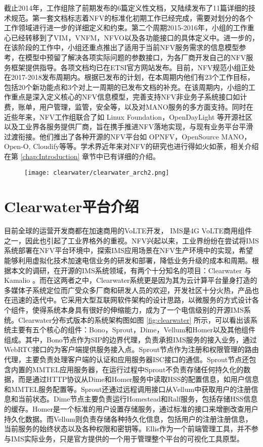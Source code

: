 截止2014年，工作组除了前期发布的6篇定义性文档，又陆续发布了11篇详细的技术规范。第一套文档标志着NFV的标准化初期工作已经完成，需要对划分的各个工作领域进行进一步的详细定义和约束。第二个周期2015-2016年，小组的工作重心已经转移到了VIM，VNFM，NFVO以及各功能接口的具体定义中。进一步的，在该阶段的工作中，小组还重点推出了适用于当前NFV服务需求的信息模型参考，在模型中预留了解决各项实际问题的参数接口，为各厂商开发自己的NFV服务框架提供指导。各项文档均已在ETSI官方网站发布。目前，NFV规范小组正处在2017-2018发布周期内。根据已发布的计划，在本周期内他们有23个工作目标，包括20个新功能点和3个对上一周期的已发布文档的补充。在该周期内，小组的工作重点是深入定义核心的NFV信息模型，完善支持NFV非业务子系统接口如计费，账单，用户管理，监管，安全等，以及对MANO服务的多方面支持。同时在近些年来，NFV工作组联合了如 Linux Foundation，OpenDayLight 等开源社区以及工业界各服务提供厂商，旨在携手推进NFV落地实现，与现有业务平台平滑过渡衔接。他们推出了各种开源的NFV平台如 OPNFV，OpenSource MANO，Open-O, Cloudify等等。学术界近年来对NFV的研究也进行得如火如荼，相关介绍在第 \ref{chap:Introduction} 章节中已有详细的介绍。

\begin{figure}[!htp]
	\centering
	\texttt{[image: clearwater/clearwater\_arch2.png]}
\end{figure}
\section{Clearwater平台介绍}
\label{intro:clearwater}
目前全球的运营开发商都在加速商用的VoLTE开发， IMS是4G  VoLTE商用组件之一，因此也引起了工业界格外的重视。NFV兴起以来，工业界纷纷在尝试将IMS系统部署在NFV平台环境中，探索IMS应用场景在NFV生产环境中的实现，希望能够利用虚拟化技术加速电信业务的研发和部署，降低业务升级的成本和周期。根据本文的调研，在开源的IMS系统领域，有两个十分知名的项目：Clearwater \cite{clearwater}与 Kamalio \cite{kamalio}。而在这两者之中，Clearwater系统更是因为其为云计算平台量身打造的多媒体子系统定位而广受众多厂商和研发人员的欢迎，开发社区十分火热，产品也在迅速的迭代中。它采用大型互联网软件架构的设计思路，以微服务的方式设计各个组件，使得系统本身具有很好的伸缩能力，成为了一个电信级别的开源IMS系统。Clearwater分布式版本的系统架构图如图 \ref{fig:clearwater} 所示，可以看出该系统主要有五个核心的组件：Bono，Sprout，Dime，Vellum和Homer以及其他组件组成。其中，Bono节点作为SIP的边界代理，负责承担IMS服务的接入业务，通过WebRTC接口的为客户端提供服务接入点。Sprout节点作为注册和权限管理的路由代理，主要负责处理客户端的认证和应用服务器ISC接口的通信。Sprout节点还包含内置的MMTEL应用服务器，在运行过程中Sprout不负责存储任何持久化的数据，而是通过HTTP协议从Dime和Homer服务中读取HSS的配置信息，如用户信息和MMTEL服务配置等。Sprout还通过远程调用接口从Vellum中获取用户的注册信息和当前状态。Dime节点主要负责运行Homestead和Ralf服务，包括存储HSS信息的缓存。Homer是一个标准的用户设置存储服务，通过标准的接口来增删改查用户持久化数据。而Vellum则负责存储各种持久化信息，包括用户的注册注册信息，当前服务的始终状态以及各种权限和密钥等。Ellis作为一个前端管理工具，并不参与IMS实际业务，只是官方提供的一个用于管理整个平台的可视化工具原型。

